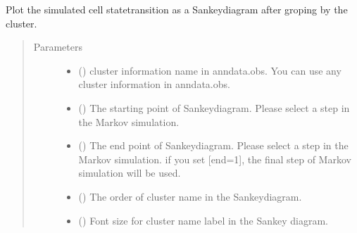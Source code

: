 \documentclass[letterpaper,10pt,english]{sphinxmanual}
\begin{document}
\begin{fulllineitems}

\begin{fulllineitems}
\label{\detokenize{modules/celloracle:celloracle.Oracle.plot_mc_resutls_as_sankey}}
Plot the simulated cell state\sphinxhyphen{}transition as a Sankey\sphinxhyphen{}diagram after groping by the cluster.
\begin{quote}\begin{description}
\item[{Parameters}] \leavevmode\begin{itemize}
\item {} 
 () \textendash{} cluster information name in anndata.obs.
You can use any cluster information in anndata.obs.

\item {} 
 () \textendash{} The starting point of Sankey\sphinxhyphen{}diagram. Please select a  step in the Markov simulation.

\item {} 
 () \textendash{} The end point of Sankey\sphinxhyphen{}diagram. Please select a  step in the Markov simulation.
if you set {[}end=\sphinxhyphen{}1{]}, the final step of Markov simulation will be used.

\item {} 
 () \textendash{} The order of cluster name in the Sankey\sphinxhyphen{}diagram.

\item {} 
 () \textendash{} Font size for cluster name label in the Sankey diagram.


\end{itemize}
\end{description}
\end{quote}
\end{fulllineitems}
\end{fulllineitems}
\end{document}
